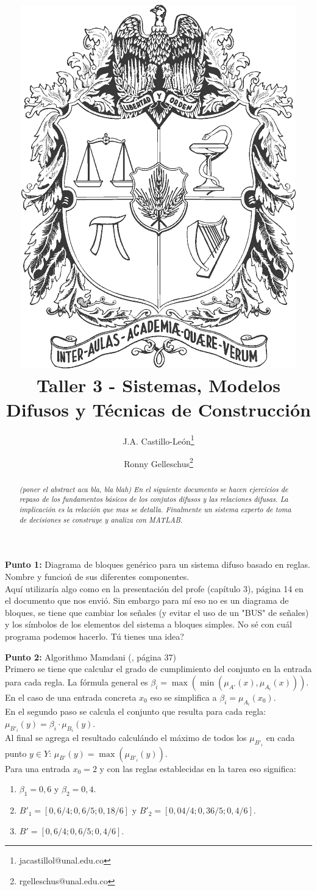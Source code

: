 \documentclass[10pt,onecolumn,twoside,letterpaper]{article}
\title{\vspace{-0.8cm}\includegraphics[scale=0.12]{unescudobn.png}\\\vspace{-0.0cm}
  \LARGE \textbf{Taller 3 - Sistemas, Modelos Difusos y T\'ecnicas de Construcci\'on}}
\author{J.A. Castillo-Le\'on\thanks{jacastillol@unal.edu.co} \and Ronny Gelleschus\thanks{rgelleschus@unal.edu.co}}
\date{}
\begin{document}
\maketitle
\begin{abstract}\noindent\small\textit{(poner el abstract aca bla, bla blah) En el siguiente documento se hacen ejercicios de repaso de los fundamentos b\'asicos de los conjutos difusos y las relaciones difusas. La implicaci\'on es la relaci\'on que mas se detalla. Finalmente un sistema experto de toma de decisiones se construye y analiza con MATLAB.}
\end{abstract}\vspace{1cm}


\par{\bf \large Punto 1:} Diagrama de bloques gen\'erico para un sistema difuso basado en reglas. Nombre y funcio\'n de sus diferentes componentes.\\
Aquí utilizaría algo como en la presentación del profe (capítulo 3), página 14 en el documento que nos envió. Sin embargo para mí eso no es un diagrama de bloques, se tiene que cambiar los señales (y evitar el uso de un "BUS" de señales) y los símbolos de los elementos del sistema a bloques simples. No sé con cuál programa podemos hacerlo. Tú tienes una idea?\\

\par{\bf \large Punto 2:} Algorithmo Mamdani (\cite{Babuska1999}, página 37)\\
Primero se tiene que calcular el grado de cumplimiento del conjunto en la entrada para cada regla. La fórmula general es $\beta_i = \max(\min(\mu_{A'}(x),\mu_{A_i}(x)))$. En el caso de una entrada concreta $x_0$ eso se simplifica a $\beta_i=\mu_{A_i}(x_0)$.\\
En el segundo paso se calcula el conjunto que resulta para cada regla: $\mu_{B'_i}(y)=\beta_i\cdot \mu_{B_i}(y)$.\\
Al final se agrega el resultado calculándo el máximo de todos los $\mu_{B'_i}$ en cada punto $y\in Y$: $\mu_{B'}(y)=\max(\mu_{B'_i}(y))$.\\
Para una entrada $x_0=2$ y con las reglas establecidas en la tarea eso significa:
\begin{enumerate}
\item $\beta_1=0,6$ y $\beta_2=0,4$.
\item $B'_1=[ 0,6/4; 0,6/5; 0,18/6]$ y $B'_2=[0,04/4; 0,36/5; 0,4/6]$.
\item $B'=[0,6/4; 0,6/5; 0,4/6]$.
\end{enumerate}
\end{document}
